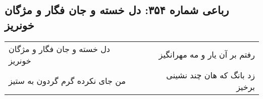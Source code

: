 \begin{center}
\section*{رباعی شماره ۳۵۴: دل خسته و جان فگار و مژگان خونریز}
\label{sec:sh354}
\begin{longtable}{l p{0.5cm} r}
دل خسته و جان فگار و مژگان خونریز
&&
رفتم بر آن یار و مه مهرانگیز
\\
من جای نکرده گرم گردون به ستیز
&&
زد بانگ که هان چند نشینی برخیز
\\
\end{longtable}
\end{center}
